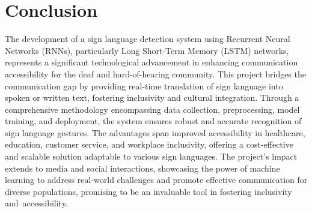 \chapter{Conclusion}
The development of a sign language detection system using Recurrent Neural Networks (RNNs), particularly Long Short-Term Memory (LSTM) networks, represents a significant technological advancement in enhancing communication accessibility for the deaf and hard-of-hearing community. This project bridges the communication gap by providing real-time translation of sign language into spoken or written text, fostering inclusivity and cultural integration. Through a comprehensive methodology encompassing data collection, preprocessing, model training, and deployment, the system ensures robust and accurate recognition of sign language gestures. The advantages span improved accessibility in healthcare, education, customer service, and workplace inclusivity, offering a cost-effective and scalable solution adaptable to various sign languages. The project's impact extends to media and social interactions, showcasing the power of machine learning to address real-world challenges and promote effective communication for diverse populations, promising to be an invaluable tool in fostering inclusivity and accessibility.